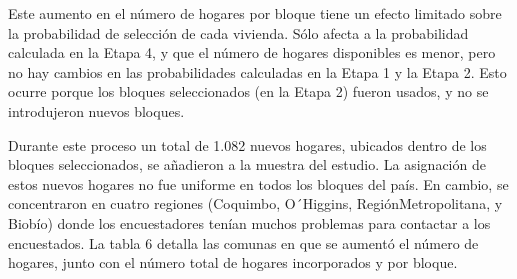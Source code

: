 \documentclass[
]{book}
\begin{document}
Este aumento en el número de hogares por bloque tiene un efecto limitado sobre la probabilidad de selección de cada vivienda. Sólo afecta a la probabilidad calculada en la Etapa 4, y que el número de hogares disponibles es menor, pero no hay cambios en las probabilidades calculadas en la Etapa 1 y la Etapa 2. Esto ocurre porque los bloques seleccionados (en la Etapa 2) fueron usados, y no se introdujeron nuevos bloques.

Durante este proceso un total de 1.082 nuevos hogares, ubicados dentro de los bloques seleccionados, se añadieron a la muestra del estudio. La asignación de estos nuevos hogares no fue uniforme en todos los bloques del país. En cambio, se concentraron en cuatro regiones (Coquimbo, O´Higgins, RegiónMetropolitana, y Biobío) donde los encuestadores tenían muchos problemas para contactar a los encuestados. La tabla 6 detalla las comunas en que se aumentó el número de hogares, junto con el número total de hogares incorporados y por bloque.
\end{document}
